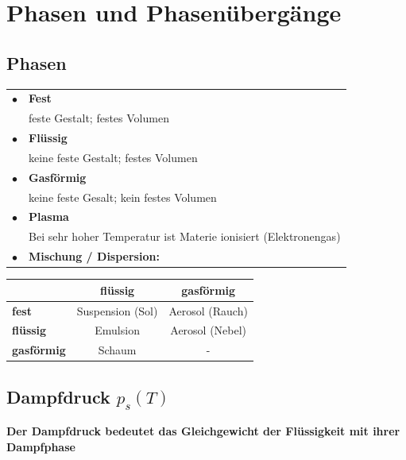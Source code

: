 \section{Phasen und Phasenübergänge}


\subsection{Phasen}


\begin{tabular}{ll}
$\bullet$ & \textbf{Fest} \\
		  & feste Gestalt; festes Volumen \\
$\bullet$ & \textbf{Flüssig} \\
		  & keine feste Gestalt; festes Volumen \\
$\bullet$ & \textbf{Gasförmig} \\
		  & keine feste Gesalt; kein festes Volumen \\
$\bullet$ & \textbf{Plasma} \\
		  & Bei sehr hoher Temperatur ist Materie ionisiert (Elektronengas) \\
$\bullet$ & \textbf{Mischung / Dispersion:} \\
\end{tabular}

\begin{center}
	\begin{tabular}{l|cc}
		                   & \textbf{flüssig} & \textbf{gasförmig} \\ \hline
		\textbf{fest}      & Suspension (Sol) & Aerosol (Rauch) \\
		\textbf{flüssig}   & Emulsion & Aerosol (Nebel) \\
		\textbf{gasförmig} & Schaum & - \\
	\end{tabular}
\end{center}






\subsection{Dampfdruck $p_s(T)$}
\textbf{Der Dampfdruck bedeutet das Gleichgewicht der Flüssigkeit mit ihrer Dampfphase} \\


